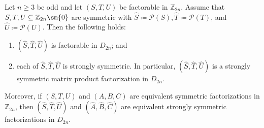 \documentclass{file}
\begin{document}
\begin{cor}\label{cor:symmetric-to-strongly-symmetric-factorable}
Let $n\ge3$ be odd and let $(S,T,U)$ be factorable in $\mathbb Z_{2n}$.
Assume that $S,T,U\subseteq\mathbb Z_{2n}\sm\{0\}$ are symmetric with 
$\widehat S\coloneqq\mathcal P(S),
\widehat T\coloneqq\mathcal P(T)$, and
$\widehat U\coloneqq\mathcal P(U)$.
Then the following holds:
\begin{enumerate}
\item $(\widehat S,\widehat T,\widehat U)$ is factorable in $D_{2n}$; and
\item each of $\widehat S,\widehat T,\widehat U$ is strongly symmetric.
In particular, $(\widehat S,\widehat T,\widehat U)$ is a strongly symmetric matrix product factorization in $D_{2n}$.
\end{enumerate}
Moreover, if $(S,T,U)$ and $(A,B,C)$ are equivalent symmetric factorizations in $\mathbb Z_{2n}$,
then $(\widehat S,\widehat T,\widehat U)$ and $(\widehat A,\widehat B,\widehat C)$ are equivalent strongly symmetric factorizations in $D_{2n}$.
\end{cor}

\end{document}
